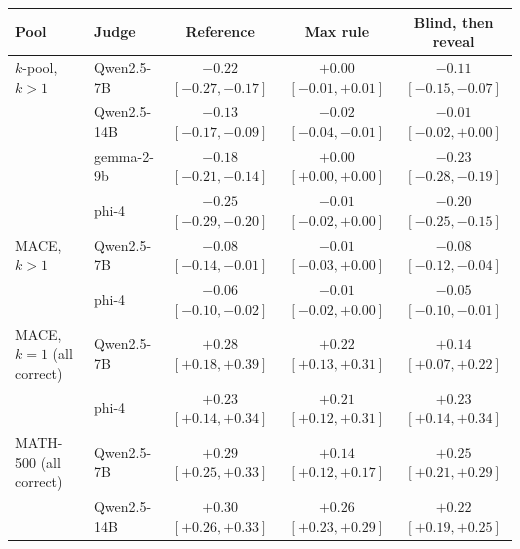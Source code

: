 \begin{tabular}{llccc}
\toprule
Pool & Judge & Reference & Max rule & Blind, then reveal \\
\midrule
$k$-pool, $k{>}1$ & Qwen2.5-7B & $-0.22$ {\scriptsize$[-0.27,-0.17]$} & $+0.00$ {\scriptsize$[-0.01,+0.01]$} & $-0.11$ {\scriptsize$[-0.15,-0.07]$} \\
 & Qwen2.5-14B & $-0.13$ {\scriptsize$[-0.17,-0.09]$} & $-0.02$ {\scriptsize$[-0.04,-0.01]$} & $-0.01$ {\scriptsize$[-0.02,+0.00]$} \\
 & gemma-2-9b & $-0.18$ {\scriptsize$[-0.21,-0.14]$} & $+0.00$ {\scriptsize$[+0.00,+0.00]$} & $-0.23$ {\scriptsize$[-0.28,-0.19]$} \\
 & phi-4 & $-0.25$ {\scriptsize$[-0.29,-0.20]$} & $-0.01$ {\scriptsize$[-0.02,+0.00]$} & $-0.20$ {\scriptsize$[-0.25,-0.15]$} \\
\addlinespace
\textsc{MACE}, $k{>}1$ & Qwen2.5-7B & $-0.08$ {\scriptsize$[-0.14,-0.01]$} & $-0.01$ {\scriptsize$[-0.03,+0.00]$} & $-0.08$ {\scriptsize$[-0.12,-0.04]$} \\
 & phi-4 & $-0.06$ {\scriptsize$[-0.10,-0.02]$} & $-0.01$ {\scriptsize$[-0.02,+0.00]$} & $-0.05$ {\scriptsize$[-0.10,-0.01]$} \\
\midrule
\textsc{MACE}, $k{=}1$ (all correct) & Qwen2.5-7B & $+0.28$ {\scriptsize$[+0.18,+0.39]$} & $+0.22$ {\scriptsize$[+0.13,+0.31]$} & $+0.14$ {\scriptsize$[+0.07,+0.22]$} \\
 & phi-4 & $+0.23$ {\scriptsize$[+0.14,+0.34]$} & $+0.21$ {\scriptsize$[+0.12,+0.31]$} & $+0.23$ {\scriptsize$[+0.14,+0.34]$} \\
MATH-500 (all correct) & Qwen2.5-7B & $+0.29$ {\scriptsize$[+0.25,+0.33]$} & $+0.14$ {\scriptsize$[+0.12,+0.17]$} & $+0.25$ {\scriptsize$[+0.21,+0.29]$} \\
 & Qwen2.5-14B & $+0.30$ {\scriptsize$[+0.26,+0.33]$} & $+0.26$ {\scriptsize$[+0.23,+0.29]$} & $+0.22$ {\scriptsize$[+0.19,+0.25]$} \\
\bottomrule
\end{tabular}
